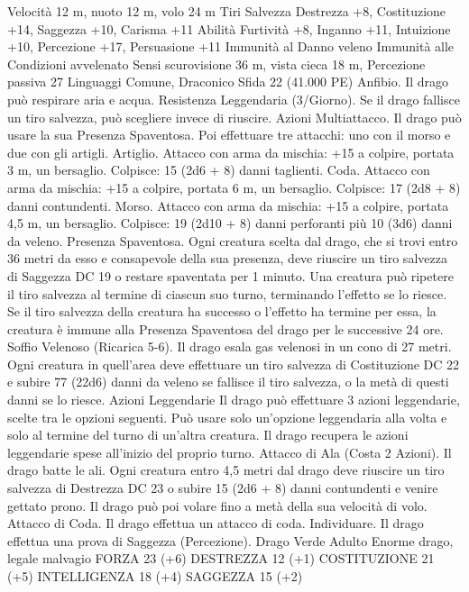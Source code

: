 \begin{multicols}{2}
Velocità 12 m, nuoto 12 m, volo 24 m
Tiri Salvezza Destrezza +8, Costituzione +14, Saggezza +10,
Carisma +11
Abilità Furtività +8, Inganno +11, Intuizione +10, Percezione
+17, Persuasione +11
Immunità al Danno veleno
Immunità alle Condizioni avvelenato
Sensi scurovisione 36 m, vista cieca 18 m, Percezione passiva 27
Linguaggi Comune, Draconico
Sfida 22 (41.000 PE)
Anfibio. Il drago può respirare aria e acqua.
Resistenza Leggendaria (3/Giorno). Se il drago fallisce un tiro
salvezza, può scegliere invece di riuscire.
Azioni
Multiattacco. Il drago può usare la sua Presenza Spaventosa. Poi
effettuare tre attacchi: uno con il morso e due con gli artigli.
Artiglio. Attacco con arma da mischia: +15 a colpire, portata 3
m, un bersaglio.
Colpisce: 15 (2d6 + 8) danni taglienti.
Coda. Attacco con arma da mischia: +15 a colpire, portata 6 m,
un bersaglio.
Colpisce: 17 (2d8 + 8) danni contundenti.
Morso. Attacco con arma da mischia: +15 a colpire, portata 4,5
m, un bersaglio.
Colpisce: 19 (2d10 + 8) danni perforanti più 10 (3d6) danni da veleno.
Presenza Spaventosa. Ogni creatura scelta dal drago, che si trovi
entro 36 metri da esso e consapevole della sua presenza, deve
riuscire un tiro salvezza di Saggezza DC 19 o restare spaventata per
1 minuto. Una creatura può ripetere il tiro salvezza al termine di
ciascun suo turno, terminando l’effetto se lo riesce. Se il tiro salvezza
della creatura ha successo o l’effetto ha termine per essa, la creatura è
immune alla Presenza Spaventosa del drago per le successive 24 ore.
Soffio Velenoso (Ricarica 5-6). Il drago esala gas velenosi in un
cono di 27 metri. Ogni creatura in quell’area deve effettuare un tiro
salvezza di Costituzione DC 22 e subire 77 (22d6) danni da veleno se
fallisce il tiro salvezza, o la metà di questi danni se lo riesce.
Azioni Leggendarie
Il drago può effettuare 3 azioni leggendarie, scelte tra le opzioni
seguenti. Può usare solo un’opzione leggendaria alla volta e solo
al termine del turno di un’altra creatura. Il drago recupera le
azioni leggendarie spese all’inizio del proprio turno.
Attacco di Ala (Costa 2 Azioni). Il drago batte le ali. Ogni
creatura entro 4,5 metri dal drago deve riuscire un tiro salvezza
di Destrezza DC 23 o subire 15 (2d6 + 8) danni contundenti e
venire gettato prono. Il drago può poi volare fino a metà della
sua velocità di volo.
Attacco di Coda. Il drago effettua un attacco di coda.
Individuare. Il drago effettua una prova di Saggezza
(Percezione).
Drago Verde Adulto
Enorme drago, legale malvagio
FORZA 23 (+6)
DESTREZZA 12 (+1)
COSTITUZIONE 21 (+5)
INTELLIGENZA 18 (+4)
SAGGEZZA 15 (+2)

\end{multicols}
